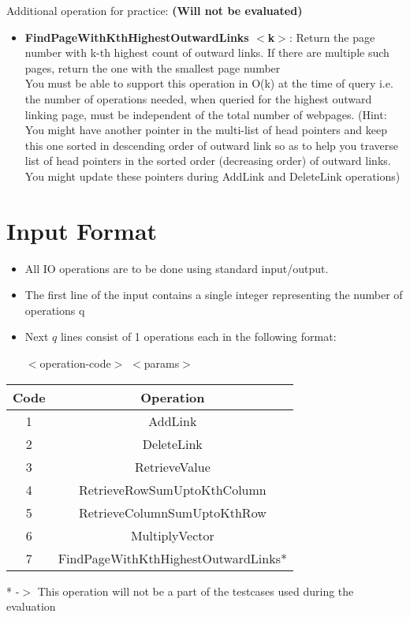 \documentclass[20pt]{article}
\begin{document}
Additional operation for practice: \textbf{(Will not be evaluated)}
\begin{itemize}
\item \textbf{FindPageWithKthHighestOutwardLinks $<$k$>$}: Return the page number with k-th highest count of outward links. If there are multiple such pages, return the one with the smallest page number %
\\
You must be able to support this operation in O(k) at the time of query i.e. the number of operations needed, when queried for the highest outward linking page, must be independent of the total number of webpages. (Hint: You might have another pointer in the multi-list of head pointers and keep this one sorted in descending order of outward link so as to help you traverse list of head pointers in the sorted order (decreasing order) of outward links. You might update these pointers during AddLink and DeleteLink operations)


\end{itemize}

\section{Input Format}
\begin{itemize}
\item All IO operations are to be done using standard input/output.
\item The first line of the input contains a single integer representing the number of operations q
\item Next $q$ lines consist of 1 operations each in the following format:
\begin{center}
$<$operation-code$>$ $<$params$>$
\end{center}
\end{itemize}

\begin{center}
\begin{tabular}{|c|c|}
\hline 
\textbf{Code} & \textbf{Operation} \\
\hline 
1 & AddLink \\ 
\hline 
2 & DeleteLink \\ 
\hline 
3 & RetrieveValue \\ 
\hline 
4 & RetrieveRowSumUptoKthColumn \\ 
\hline 
5 & RetrieveColumnSumUptoKthRow \\ 
\hline 
6 & MultiplyVector \\ 
\hline 
7 & FindPageWithKthHighestOutwardLinks*\\ 
\hline
\end{tabular} 
\end{center}
* -$>$ This operation will not be a part of the testcases used during the evaluation
\end{document}
